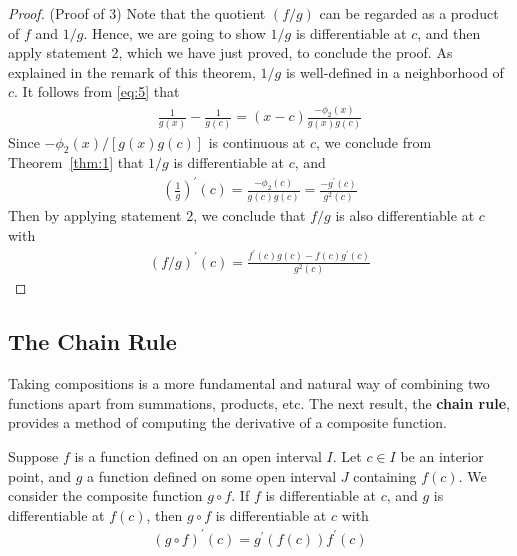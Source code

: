 \documentclass[thmcnt=section, 12pt]{my-elegantbook}
\begin{document}
\begin{proof}
    (Proof of 3) Note that the quotient $(f / g)$ can be regarded as a product of $f$ and $1 / g$. Hence, we are going to show $1/g$ is differentiable at $c$, and then apply statement 2, which we have just proved, to conclude the proof. As explained in the remark of this theorem, $1/g$ is well-defined in a neighborhood of $c$. It follows from \eqref{eq:5} that
    \begin{align*}
        \frac{1}{g(x)} - \frac{1}{g(c)}
        = (x - c) \frac{-\phi_2(x)}{g(x)g(c)}
    \end{align*}
    Since $-\phi_2(x) / [g(x)g(c)]$ is continuous at $c$, we conclude from Theorem~\ref{thm:1} that $1/g$ is differentiable at $c$, and
    \begin{align*}
        \left( \frac{1}{g} \right)^\prime (c)
        = \frac{-\phi_2(c)}{g(c)g(c)}
        = \frac{-g^\prime(c)}{g^2(c)}
    \end{align*}
    Then by applying statement 2, we conclude that $f / g$ is also differentiable at $c$ with
    \begin{align*}
        (f / g)^\prime(c) = \frac{f^\prime(c) g(c) - f(c) g^\prime(c)}{ g^2(c) }
    \end{align*}
\end{proof}


\subsection{The Chain Rule}

Taking compositions is a more fundamental and natural way of combining two functions apart from summations, products, etc. The next result, the \textbf{chain rule}, provides a method of computing the derivative of a composite function.

\begin{theorem} \label{thm:4}
    Suppose $f$ is a function defined on an open interval $I$.
    Let $c \in I$ be an interior point,
    and $g$ a function defined on some open interval $J$ containing $f(c)$.
    We consider the composite function $g \circ f$.
    If $f$ is differentiable at $c$,
    and $g$ is differentiable at $f(c)$,
    then $g \circ f$ is differentiable at $c$ with
    \begin{align}
        (g \circ f)^\prime (c)
        = g^\prime(f(c)) f^\prime(c)
        \label{eq:9}
    \end{align}
\end{theorem}
\end{document}
